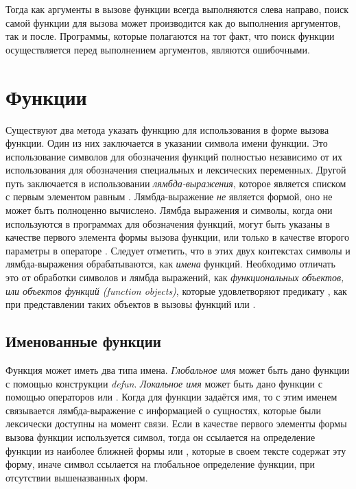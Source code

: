 Тогда как аргументы в вызове функции всегда выполняются слева направо,
поиск самой функции для вызова может производится как до выполнения аргументов,
так и после. Программы, которые полагаются на тот факт, что поиск функции
осуществляется перед выполнением аргументов, являются ошибочными.

\section{Функции}

Существуют два метода указать функцию для использования в форме вызова
функции. Один из них заключается в указании символа имени функции. Это
использование символов для обозначения функций полностью независимо от их
использования для обозначения специальных и лексических переменных. Другой путь
заключается в использовании \emph{лямбда-выражения}, которое является списком
с первым элементом равным . Лямбда-выражение \emph{не} является
формой, оно не может быть полноценно вычислено. Лямбда выражения и символы,
когда они используются в программах для обозначения функций, могут быть
указаны в качестве первого элемента формы вызова функции, или только в качестве
второго параметры в операторе . Следует отметить, что
в этих двух контекстах символы и лямбда-выражения обрабатываются, как
\emph{имена} функций. Необходимо отличать это от обработки символов и лямбда
выражений, как \emph{функциональных объектов, или объектов функций (function
  objects)}, которые удовлетворяют предикату , как при
представлении таких объектов в вызовы функций  или . 

\subsection{Именованные функции}

Функция может иметь два типа имена.
\emph{Глобальное имя} может быть дано функции с помощью конструкции
\emph{defun}.
\emph{Локальное имя} может быть дано функции с помощью операторов
 или .
Когда для функции задаётся имя, то с этим именем связывается лямбда-выражение с
информацией о сущностях, которые были лексически доступны на момент связи.
Если в качестве первого элементы формы вызова функции используется символ, тогда
он ссылается на определение функции из наиболее ближней формы  или
, которые в своем тексте содержат эту форму, иначе символ ссылается на
глобальное определение функции, при отсутствии вышеназванных форм.

